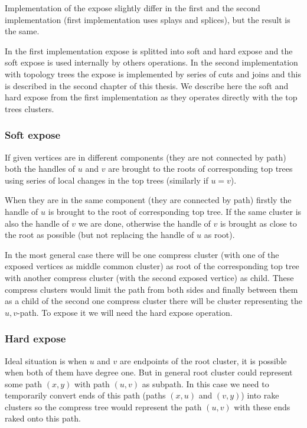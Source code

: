 Implementation of the expose slightly differ in the first and the second
implementation (first implementation uses splays and splices), but the result
is the same.

In the first implementation expose is splitted into soft and hard expose and the
soft expose is used internally by others operations. In the second
implementation with topology trees the expose is implemented by series of cuts
and joins and this is described in the second chapter of this thesis. We
describe here the soft and hard expose from the first implementation as they
operates directly with the top trees clusters.

\subsubsection{Soft expose}

If given vertices are in different components (they are not connected by path)
both the handles of $u$ and $v$ are brought to the roots of corresponding top
trees using series of local changes in the top trees (similarly if $u=v$).

When they are in the same component (they are connected by path) firstly the
handle of $u$ is brought to the root of corresponding top tree. If the same
cluster is also the handle of $v$ we are done, otherwise the handle of $v$ is
brought as close to the root as possible (but not replacing the handle of $u$ as
root).

In the most general case there will be one compress cluster (with one of the
exposed vertices as middle common cluster) as root of the corresponding top tree
with another compress cluster (with the second exposed vertice) as child. These
compress clusters would limit the path from both sides and finally between them
as a child of the second one compress cluster there will be cluster representing
the $u,v$-path. To expose it we will need the hard expose operation.

\subsubsection{Hard expose}

Ideal situation is when $u$ and $v$ are endpoints of the root cluster, it is
possible when both of them have degree one. But in general root cluster could
represent some path $(x,y)$ with path $(u,v)$ as subpath. In this case we need
to temporarily convert ends of this path (paths $(x,u)$ and $(v,y)$) into rake
clusters so the compress tree would represent the path $(u,v)$ with these ends
raked onto this path.

